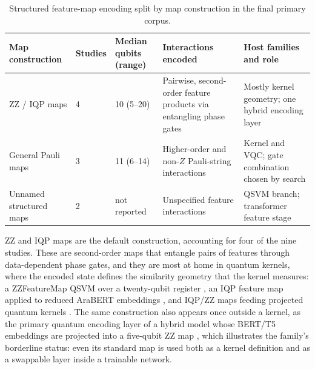 \documentclass{ieeeaccess}
\begin{document}
\begin{table}[t]
\caption{Structured feature-map encoding split by map construction in the final primary corpus.}
\label{tab:structured_by_construction}
\centering
\scriptsize
\begin{tabular}{@{}p{} p{} p{} p{} p{}@{}}
\hline
\textbf{Map construction} & \textbf{Studies} & \textbf{Median qubits (range)} & \textbf{Interactions encoded} & \textbf{Host families and role} \\
\hline
ZZ / IQP maps & 4 & 10 (5--20) & Pairwise, second-order feature products via entangling phase gates & Mostly kernel geometry; one hybrid encoding layer \\
General Pauli maps & 3 & 11 (6--14) & Higher-order and non-$Z$ Pauli-string interactions & Kernel and VQC; gate combination chosen by search \\
Unnamed structured maps & 2 & not reported & Unspecified feature interactions & QSVM branch; transformer feature stage \\
\hline
\end{tabular}
\end{table}

ZZ and IQP maps are the default construction, accounting for four of the nine studies. These are second-order maps that entangle pairs of features through data-dependent phase gates, and they are most at home in quantum kernels, where the encoded state defines the similarity geometry that the kernel measures: a ZZFeatureMap QSVM over a twenty-qubit register \cite{widdows_near-term_2024}, an IQP feature map applied to reduced AraBERT embeddings \cite{djemmal_arabert-qc_2025}, and IQP/ZZ maps feeding projected quantum kernels \cite{keith-norambuena_quantum_2026}. The same construction also appears once outside a kernel, as the primary quantum encoding layer of a hybrid model whose BERT/T5 embeddings are projected into a five-qubit ZZ map \cite{baik_neural_2025}, which illustrates the family's borderline status: even its standard map is used both as a kernel definition and as a swappable layer inside a trainable network.
\end{document}
